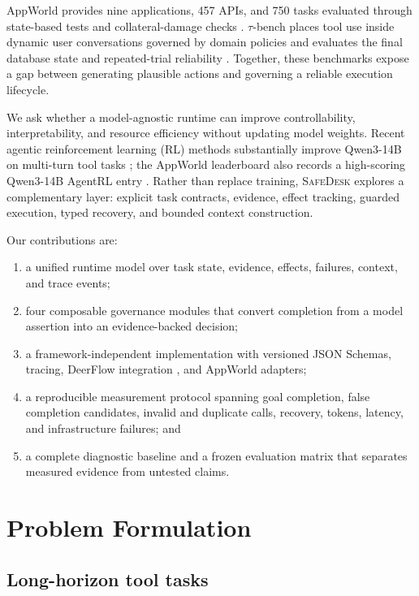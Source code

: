 \documentclass[10pt]{article}
\newcommand{\safedesk}{\textsc{SafeDesk}}
\begin{document}
AppWorld provides nine applications, 457 APIs, and 750 tasks evaluated through
state-based tests and collateral-damage checks \citep{trivedi2024appworld}.
$\tau$-bench places tool use inside dynamic user conversations governed by domain
policies and evaluates the final database state and repeated-trial reliability
\citep{yao2024taubench}. Together, these benchmarks expose a gap between
generating plausible actions and governing a reliable execution lifecycle.

We ask whether a model-agnostic runtime can improve controllability,
interpretability, and resource efficiency without updating model weights. Recent
agentic reinforcement learning (RL) methods substantially improve Qwen3-14B on
multi-turn tool tasks \citep{hu2026seeupo}; the AppWorld leaderboard also records
a high-scoring Qwen3-14B AgentRL entry \citep{appworldleaderboard2026}. Rather than
replace training, \safedesk{} explores a complementary layer: explicit task
contracts, evidence, effect tracking, guarded execution, typed recovery, and
bounded context construction.

Our contributions are:
\begin{enumerate}[leftmargin=*,itemsep=2pt]
  \item a unified runtime model over task state, evidence, effects, failures,
        context, and trace events;
  \item four composable governance modules that convert completion from a model
        assertion into an evidence-backed decision;
  \item a framework-independent implementation with versioned JSON Schemas,
        tracing, DeerFlow integration \citep{deerflow2026}, and AppWorld adapters;
  \item a reproducible measurement protocol spanning goal completion, false
        completion candidates, invalid and duplicate calls, recovery, tokens,
        latency, and infrastructure failures; and
  \item a complete diagnostic baseline and a frozen evaluation matrix that
        separates measured evidence from untested claims.
\end{enumerate}

\section{Problem Formulation}

\subsection{Long-horizon tool tasks}
\end{document}
